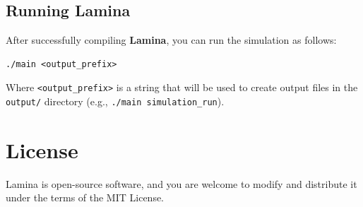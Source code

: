 \documentclass[a4paper,10pt]{article}
\begin{document}
\subsection*{Running Lamina}

After successfully compiling \textbf{Lamina}, you can run the simulation as follows:

\begin{verbatim}
./main <output_prefix>
\end{verbatim}

Where \texttt{<output\_prefix>} is a string that will be used to create output files in the \texttt{output/} directory (e.g., \texttt{./main simulation\_run}).

\section*{License}

Lamina is open-source software, and you are welcome to modify and distribute it under the terms of the MIT License.
\end{document}
